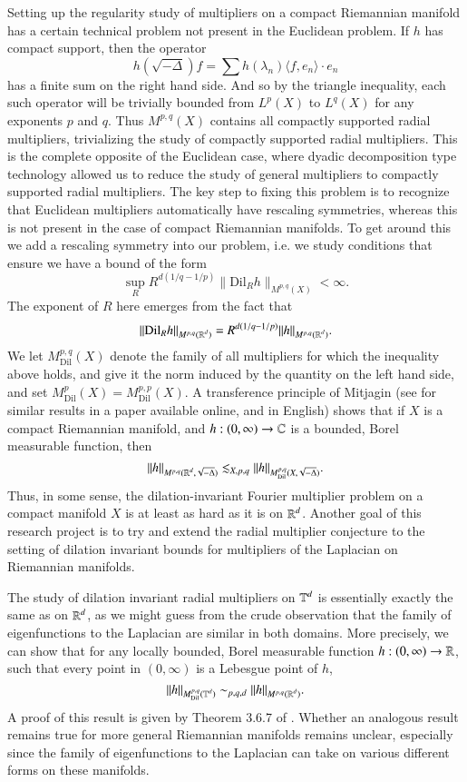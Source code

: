 Setting up the regularity study of multipliers on a compact Riemannian manifold has a certain technical problem not present in the Euclidean problem. If $h$ has compact support, then the operator
%
\[ h \left( \sqrt{-\Delta} \right) f = \sum h(\lambda_n) \langle f, e_n \rangle \cdot e_n \]
%
has a finite sum on the right hand side. And so by the triangle inequality, each such operator will be trivially bounded from $L^p(X)$ to $L^q(X)$ for any exponents $p$ and $q$. Thus $M^{p,q}(X)$ contains all compactly supported radial multipliers, trivializing the study of compactly supported radial multipliers. This is the complete opposite of the Euclidean case, where dyadic decomposition type technology allowed us to reduce the study of general multipliers to compactly supported radial multipliers. The key step to fixing this problem is to recognize that Euclidean multipliers automatically have rescaling symmetries, whereas this is not present in the case of compact Riemannian manifolds. To get around this we add a rescaling symmetry into our problem, i.e. we study conditions that ensure we have a bound of the form
%
\[ \sup_R R^{d(1/q - 1/p)} \| \text{Dil}_R h \|_{M^{p,q}(X)} < \infty. \]
%
The exponent of $R$ here emerges from the fact that
%
\[ \| \text{Dil}_R h \|_{M^{p,q}(\operatorname{\mathbb{R}}^d)} = R^{d(1/q - 1/p)} \| h \|_{M^{p,q}(\operatorname{\mathbb{R}}^d)}. \]
%
We let $M^{p,q}_{\text{Dil}}(X)$ denote the family of all multipliers for which the inequality above holds, and give it the norm induced by the quantity on the left hand side, and set $M^p_{\text{Dil}}(X) = M^{p,p}_{\text{Dil}}(X)$. A transference principle of Mitjagin \cite{Mitjagin} (see \cite{KenigStantonTomas} for similar results in a paper available online, and in English) shows that if $X$ is a compact Riemannian manifold, and $h: (0,\infty) \to \operatorname{\mathbb{C}}$ is a bounded, Borel measurable function, then
%
\[ \| h \|_{M^{p,q}(\operatorname{\mathbb{R}}^d, \sqrt{-\Delta})} \lesssim_{X,p,q} \| h \|_{M^{p,q}_{\text{Dil}}(X, \sqrt{-\Delta})}. \]
%
Thus, in some sense, the dilation-invariant Fourier multiplier problem on a compact manifold $X$ is at least as hard as it is on $\operatorname{\mathbb{R}}^d$. Another goal of this research project is to try and extend the radial multiplier conjecture to the setting of dilation invariant bounds for multipliers of the Laplacian on Riemannian manifolds.

The study of dilation invariant radial multipliers on $\operatorname{\mathbb{T}}^d$ is essentially exactly the same as on $\operatorname{\mathbb{R}}^d$, as we might guess from the crude observation that the family of eigenfunctions to the Laplacian are similar in both domains. More precisely, we can show that for any locally bounded, Borel measurable function $h: (0,\infty) \to \operatorname{\mathbb{R}}$, such that every point in $(0,\infty)$ is a Lebesgue point of $h$,
%
\[ \| h \|_{M^{p,q}_{\text{Dil}}(\operatorname{\mathbb{T}}^d)} \sim_{p,q,d} \| h \|_{M^{p,q}(\operatorname{\mathbb{R}}^d)}. \]
%
A proof of this result is given by Theorem 3.6.7 of \cite{Grafakos}. Whether an analogous result remains true for more general Riemannian manifolds remains unclear, especially since the family of eigenfunctions to the Laplacian can take on various different forms on these manifolds.

